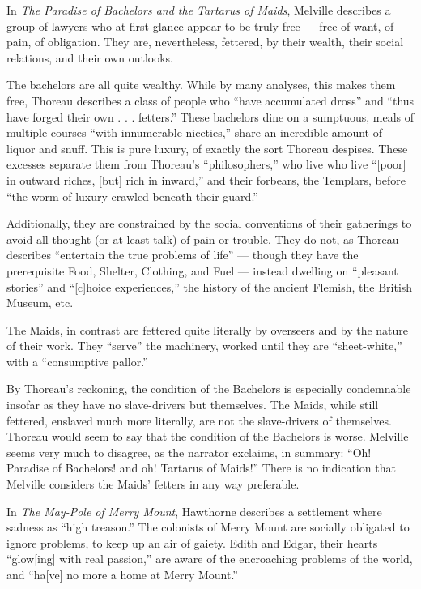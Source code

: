\documentclass[man,12pt,natbib]{apa6}
\begin{document}
In \emph{The Paradise of Bachelors and the Tartarus of Maids}, Melville
describes a group of lawyers who at first glance appear to be truly free ---
free of want, of pain, of obligation. They are, nevertheless, fettered, by
their wealth, their social relations, and their own outlooks.

The bachelors are all quite wealthy. While by many analyses, this makes them
free, Thoreau describes a class of people who ``have accumulated dross'' and
``thus have forged their own . . . fetters.'' These bachelors dine on a
sumptuous, meals of multiple courses ``with innumerable niceties,'' share an
incredible amount of liquor and snuff. This is pure luxury, of exactly the sort
Thoreau despises.  These excesses separate them from Thoreau's
``philosophers,'' who live who live ``[poor] in outward riches, [but] rich in
inward,'' and their forbears, the Templars, before ``the worm of luxury crawled
beneath their guard.''

Additionally, they are constrained by the social conventions of their
gatherings to avoid all thought (or at least talk) of pain or trouble. They do
not, as Thoreau describes ``entertain the true problems of life'' --- though
they have the prerequisite Food, Shelter, Clothing, and Fuel --- instead
dwelling on ``pleasant stories'' and ``[c]hoice experiences,'' the history of
the ancient Flemish, the British Museum, etc. 

The Maids, in contrast are fettered quite literally by overseers and by the
nature of their work. They ``serve'' the machinery, worked until they are
``sheet-white,'' with a ``consumptive pallor.''

By Thoreau's reckoning, the condition of the Bachelors is especially
condemnable insofar as they have no slave-drivers but themselves. The Maids,
while still fettered, enslaved much more literally, are not the slave-drivers
of themselves.  Thoreau would seem to say that the condition of the Bachelors
is worse.  Melville seems very much to disagree, as the narrator exclaims, in
summary: ``Oh! Paradise of Bachelors! and oh! Tartarus of Maids!'' There is no
indication that Melville considers the Maids' fetters in any way preferable.

In \emph{The May-Pole of Merry Mount}, Hawthorne describes a settlement where
sadness as ``high treason.'' The colonists of Merry Mount are socially
obligated to ignore problems, to keep up an air of gaiety. Edith and Edgar,
their hearts ``glow[ing] with real passion,'' are aware of the encroaching
problems of the world, and ``ha[ve] no more a home at Merry Mount.''
\end{document}
